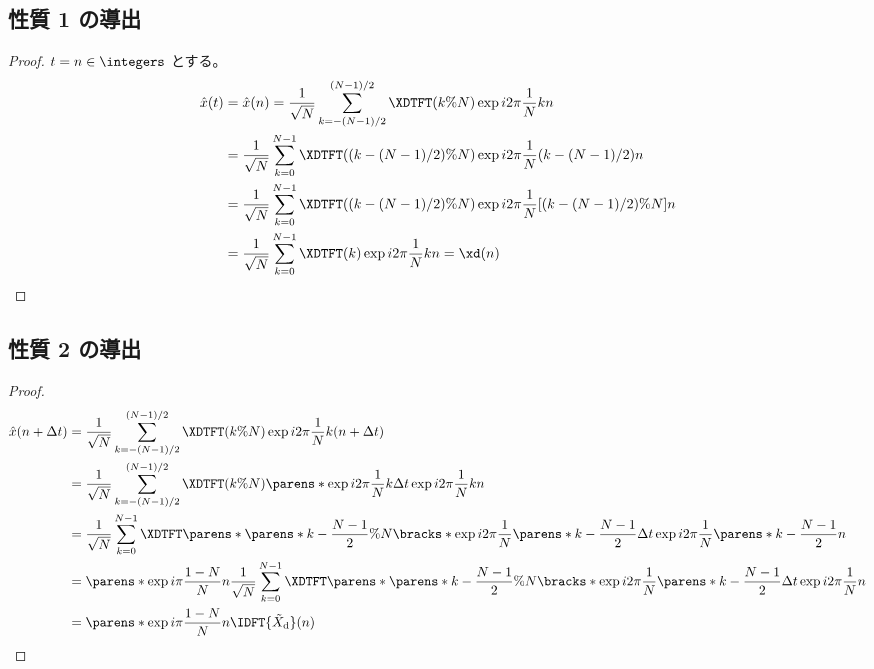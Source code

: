         \subsection{性質 1 の導出}
            \begin{proof}
                \quad\par
                $t = n\in\integers$ とする。
                \begin{align*}
                    \hat{x}(t) &= \hat{x}(n) = \frac{1}{\sqrt{N}}\sum_{k=-(N-1)/2}^{(N-1)/2}\XDTFT(k\%N)\exp i2\pi\frac{1}{N}kn \\
                    &= \frac{1}{\sqrt{N}}\sum_{k=0}^{N-1}\XDTFT((k-(N-1)/2)\%N)\exp i2\pi\frac{1}{N}(k-(N-1)/2)n \\
                    &= \frac{1}{\sqrt{N}}\sum_{k=0}^{N-1}\XDTFT((k-(N-1)/2)\%N)\exp i2\pi\frac{1}{N}[(k-(N-1)/2)\%N]n \\
                    &= \frac{1}{\sqrt{N}}\sum_{k=0}^{N-1}\XDTFT(k)\exp i2\pi\frac{1}{N}kn = \xd(n)
                \end{align*}
            \end{proof}
        \subsection{性質 2 の導出}
            \begin{proof}
                \begin{align*}
                    \hat{x}(n+\Delta t) &= \frac{1}{\sqrt{N}}\sum_{k=-(N-1)/2}^{(N-1)/2}\XDTFT(k\%N)\exp i2\pi\frac{1}{N}k(n+\Delta t) \\
                    &= \frac{1}{\sqrt{N}}\sum_{k=-(N-1)/2}^{(N-1)/2}\XDTFT(k\%N)\parens*{\exp i2\pi\frac{1}{N}k\Delta t}\exp i2\pi\frac{1}{N}kn \\
                    &= \frac{1}{\sqrt{N}}\sum_{k=0}^{N-1}\XDTFT\parens*{\parens*{k-\frac{N-1}{2}}\%N}\bracks*{\exp i2\pi\frac{1}{N}\parens*{k-\frac{N-1}{2}}\Delta t}\exp i2\pi\frac{1}{N}\parens*{k-\frac{N-1}{2}}n \\
                    &= \parens*{\exp i\pi\frac{1-N}{N}n}\frac{1}{\sqrt{N}}\sum_{k=0}^{N-1}\XDTFT\parens*{\parens*{k-\frac{N-1}{2}}\%N}\bracks*{\exp i2\pi\frac{1}{N}\parens*{k-\frac{N-1}{2}}\Delta t}\exp i2\pi\frac{1}{N}n \\
                    &= \parens*{\exp i\pi\frac{1-N}{N}n}\IDFT{\Xtilded}(n)
                \end{align*}
            \end{proof}
